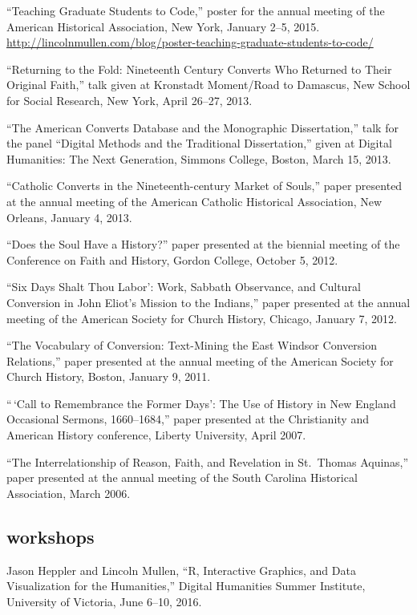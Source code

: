 \documentclass[11pt]{article}
\begin{document}
``Teaching Graduate Students to Code,'' poster for the annual meeting of the
American Historical Association, New York, January 2--5, 2015.
\url{http://lincolnmullen.com/blog/poster-teaching-graduate-students-to-code/}

``Returning to the Fold: Nineteenth Century Converts Who Returned to
Their Original Faith,'' talk given at Kronstadt Moment/Road to Damascus,
New School for Social Research, New York, April 26--27, 2013.

``The American Converts Database and the Monographic Dissertation,''
talk for the panel ``Digital Methods and the Traditional Dissertation,''
given at Digital Humanities: The Next Generation, Simmons College,
Boston, March 15, 2013.

``Catholic Converts in the Nineteenth-century Market of Souls,'' paper
presented at the annual meeting of the American Catholic Historical
Association, New Orleans, January 4, 2013.

``Does the Soul Have a History?'' paper presented at the biennial
meeting of the Conference on Faith and History, Gordon College, October
5, 2012.

``Six Days Shalt Thou Labor': Work, Sabbath Observance, and Cultural
Conversion in John Eliot's Mission to the Indians,'' paper presented at
the annual meeting of the American Society for Church History, Chicago,
January 7, 2012.

``The Vocabulary of Conversion: Text-Mining the East Windsor Conversion
Relations,'' paper presented at the annual meeting of the American
Society for Church History, Boston, January 9, 2011.

``\,`Call to Remembrance the Former Days': The Use of History in New
England Occasional Sermons, 1660--1684,'' paper presented at the
Christianity and American History conference, Liberty University, April
2007.

``The Interrelationship of Reason, Faith, and Revelation in St.~Thomas
Aquinas,'' paper presented at the annual meeting of the South Carolina
Historical Association, March 2006.

\subsection{workshops}\label{workshops}

Jason Heppler and Lincoln Mullen, ``R, Interactive Graphics, and Data 
Visualization for the Humanities,'' Digital Humanities Summer Institute, University of Victoria, June 6--10, 2016.  
\end{document}
